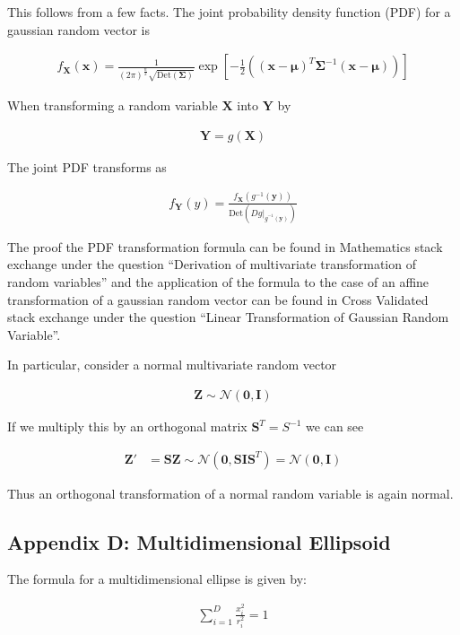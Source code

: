\documentclass[12pt]{article}
\newcommand{\bv}[1]{\boldsymbol{#1}}
\begin{document}
This follows from a few facts. The joint probability density function (PDF) for a gaussian random vector is

\begin{align}
f_{\bv{X}}(\bv{x}) = \frac{1}{(2\pi)^{\frac{n}{2}}\sqrt{\text{Det}(\bv{\Sigma})}}\exp\left[-\frac{1}{2}\left((\bv{x}-\bv{\mu})^T\bv{\Sigma}^{-1}(\bv{x}-\bv{\mu})\right)\right]
\end{align}

When transforming a random variable $\bv{X}$ into $\bv{Y}$ by

\begin{align}
\bv{Y} = g(\bv{X})
\end{align}

The joint PDF transforms as

\begin{align}
f_{\bv{Y}}(y) = \frac{f_{\bv{X}}(g^{-1}(\bv{y}))}{\text{Det}(Dg|_{g^{-1}(\bv{y})})}
\end{align}

The proof the PDF transformation formula can be found in Mathematics stack exchange under the question ``Derivation of multivariate transformation of random variables'' and the application of the formula to the case of an affine transformation of a gaussian random vector can be found in Cross Validated stack exchange under the question ``Linear Transformation of Gaussian Random Variable''.

In particular, consider a normal multivariate random vector

\begin{align}
\bv{Z} \sim \mathcal{N}(\bv{0}, \bv{I})
\end{align}

If we multiply this by an orthogonal matrix $\bv{S}^T = S^{-1}$ we can see

\begin{align}
\bv{Z}' &= \bv{S}\bv{Z} \sim \mathcal{N}(\bv{0}, \bv{S}\bv{I}\bv{S}^T) = \mathcal{N}(\bv{0}, \bv{I}) 
\end{align}

Thus an orthogonal transformation of a normal random variable is again normal.

\subsection{Appendix D: Multidimensional Ellipsoid}

The formula for a multidimensional ellipse is given by:

\begin{align}
\sum_{i=1}^D \frac{x_i^2}{r_i^2} = 1
\end{align}
\end{document}
